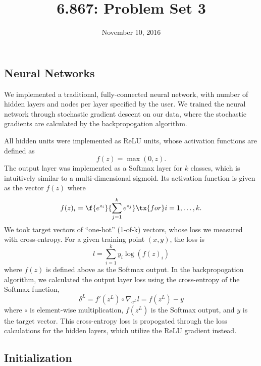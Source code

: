 \documentclass{article}
\title{6.867: Problem Set 3}
\date{November 10, 2016}
\begin{document}
\maketitle

\begin{multicols}{2}


\section{Neural Networks}
\label{sec:nn}

We implemented a traditional, fully-connected neural network, with
number of hidden layers and nodes per layer specified by the user.
We trained the neural network through stochastic gradient descent on
our data, where the stochastic gradients are calculated by the
backpropogation algorithm.

All hidden units were implemented as ReLU units, whose activation functions
are defined as
\begin{equation}
    f(z) = \max(0, z).
\end{equation}
The output layer was implemented as a Softmax layer for $k$ classes,
which is intuitively similar to a multi-dimensional sigmoid. Its activation function
is given as the vector $f(z)$ where
\begin{equation}
    f(z)_i = \f{e^{z_i}}{\sum_{j=1}^{k}{e^{z_j}}} \tx{ for } i = 1,\dots,k.
\end{equation}
We took target vectors of ``one-hot'' (1-of-k) vectors, whose loss we measured
with cross-entropy. For a given training point $(x,y)$, the loss is
\begin{equation}
l = \sum_{i = 1}^k{y_i \log(f(z)_i)}
\end{equation}
where $f(z)$ is defined above as the Softmax output.
In the backpropogation algorithm, we calculated the output layer loss using the
cross-entropy of the Softmax function,
\begin{equation}\delta^L = f'(z^L)\circ\nabla_{a^L}l = f(z^L) - y\end{equation}
where $\circ$ is element-wise multiplication, $f(z^L)$ is the Softmax output,
and $y$ is the target vector. This cross-entropy loss is propogated through the 
loss calculations for the hidden layers, which utilize the ReLU gradient instead.

\subsection{Initialization}


\end{multicols}
\end{document}
